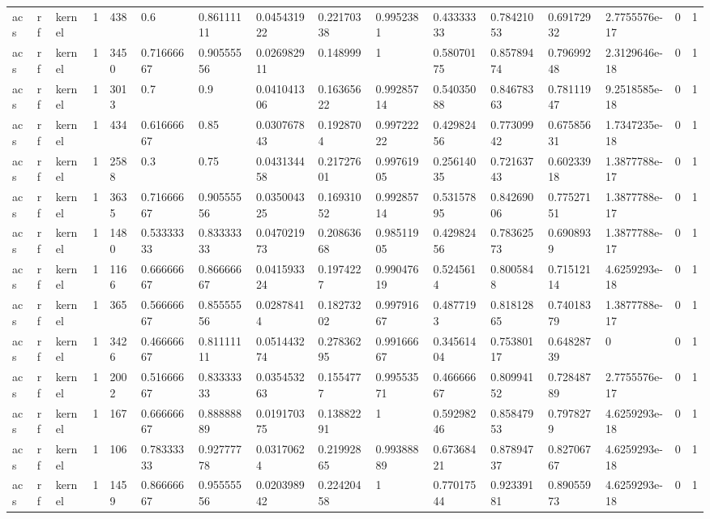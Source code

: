 \begin{tabular}{llllllllllllllll}
acs & rf & kernel & 1 & 438 & 0.6 & 0.86111111 & 0.045431922 & 0.22170338 & 0.9952381 & 0.43333333 & 0.78421053 & 0.69172932 & 2.7755576e-17 & 0 & 1 \\
acs & rf & kernel & 1 & 3450 & 0.71666667 & 0.90555556 & 0.026982911 & 0.148999 & 1 & 0.58070175 & 0.85789474 & 0.79699248 & 2.3129646e-18 & 0 & 1 \\
acs & rf & kernel & 1 & 3013 & 0.7 & 0.9 & 0.041041306 & 0.16365622 & 0.99285714 & 0.54035088 & 0.84678363 & 0.78111947 & 9.2518585e-18 & 0 & 1 \\
acs & rf & kernel & 1 & 434 & 0.61666667 & 0.85 & 0.030767843 & 0.1928704 & 0.99722222 & 0.42982456 & 0.77309942 & 0.67585631 & 1.7347235e-18 & 0 & 1 \\
acs & rf & kernel & 1 & 2588 & 0.3 & 0.75 & 0.043134458 & 0.21727601 & 0.99761905 & 0.25614035 & 0.72163743 & 0.60233918 & 1.3877788e-17 & 0 & 1 \\
acs & rf & kernel & 1 & 3635 & 0.71666667 & 0.90555556 & 0.035004325 & 0.16931052 & 0.99285714 & 0.53157895 & 0.84269006 & 0.77527151 & 1.3877788e-17 & 0 & 1 \\
acs & rf & kernel & 1 & 1480 & 0.53333333 & 0.83333333 & 0.047021973 & 0.20863668 & 0.98511905 & 0.42982456 & 0.78362573 & 0.6908939 & 1.3877788e-17 & 0 & 1 \\
acs & rf & kernel & 1 & 1166 & 0.66666667 & 0.86666667 & 0.041593324 & 0.1974227 & 0.99047619 & 0.5245614 & 0.8005848 & 0.71512114 & 4.6259293e-18 & 0 & 1 \\
acs & rf & kernel & 1 & 365 & 0.56666667 & 0.85555556 & 0.02878414 & 0.18273202 & 0.99791667 & 0.4877193 & 0.81812865 & 0.74018379 & 1.3877788e-17 & 0 & 1 \\
acs & rf & kernel & 1 & 3426 & 0.46666667 & 0.81111111 & 0.051443274 & 0.27836295 & 0.99166667 & 0.34561404 & 0.75380117 & 0.64828739 & 0 & 0 & 1 \\
acs & rf & kernel & 1 & 2002 & 0.51666667 & 0.83333333 & 0.035453263 & 0.1554777 & 0.99553571 & 0.46666667 & 0.80994152 & 0.72848789 & 2.7755576e-17 & 0 & 1 \\
acs & rf & kernel & 1 & 167 & 0.66666667 & 0.88888889 & 0.019170375 & 0.13882291 & 1 & 0.59298246 & 0.85847953 & 0.7978279 & 4.6259293e-18 & 0 & 1 \\
acs & rf & kernel & 1 & 106 & 0.78333333 & 0.92777778 & 0.03170624 & 0.21992865 & 0.99388889 & 0.67368421 & 0.87894737 & 0.82706767 & 4.6259293e-18 & 0 & 1 \\
acs & rf & kernel & 1 & 1459 & 0.86666667 & 0.95555556 & 0.020398942 & 0.22420458 & 1 & 0.77017544 & 0.92339181 & 0.89055973 & 4.6259293e-18 & 0 & 1 \\

\end{tabular}
